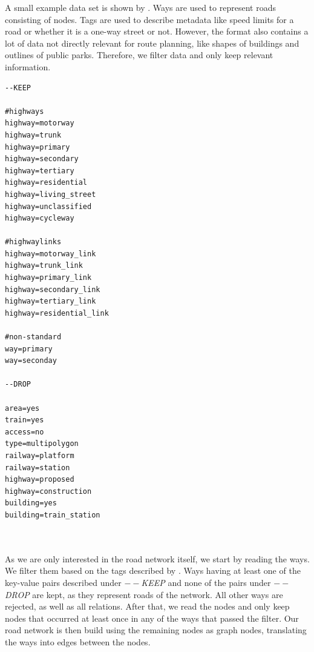 	A small \osm example data set is shown by . Ways are used to represent roads consisting
	of nodes. Tags are used to describe metadata like speed limits for a road or whether it is a one-way street or not.
	However, the format also contains a lot of data not directly relevant for route planning, like shapes of buildings
	and outlines of public parks. Therefore, we filter \osm data and only keep relevant information.
	\begin{lstlisting}[caption={Tag filter for \osm ways.},label={osmFilter},style={FilterStyle},mathescape={true},
		float,floatplacement=ht]
--KEEP

#highways
highway=motorway
highway=trunk
highway=primary
highway=secondary
highway=tertiary
highway=residential
highway=living_street
highway=unclassified
highway=cycleway

#highwaylinks
highway=motorway_link
highway=trunk_link
highway=primary_link
highway=secondary_link
highway=tertiary_link
highway=residential_link

#non-standard
way=primary
way=seconday

--DROP

area=yes
train=yes
access=no
type=multipolygon
railway=platform
railway=station
highway=proposed
highway=construction
building=yes
building=train_station
	\end{lstlisting}\quad\\\\
	As we are only interested in the road network itself, we start by reading the ways. We filter them based on the tags
	described by . Ways having at least one of the key-value pairs described under \textit{$--$KEEP}
	and none of the pairs under \textit{$--$DROP} are kept, as they represent roads of the network. All other ways are
	rejected, as well as all relations.
	After that, we read the nodes and only keep nodes that occurred at least once in any of the ways that passed the filter.
	Our road network is then build using the remaining nodes as graph nodes, translating the ways into edges between the nodes.
	

